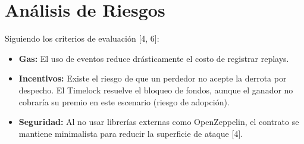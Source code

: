 \documentclass[twocolumn, 10pt]{article}
\begin{document}
\section{Análisis de Riesgos}
Siguiendo los criterios de evaluación [4, 6]:
\begin{itemize}
    \item \textbf{Gas:} El uso de eventos reduce drásticamente el costo de registrar replays.
    \item \textbf{Incentivos:} Existe el riesgo de que un perdedor no acepte la derrota por despecho. El Timelock resuelve el bloqueo de fondos, aunque el ganador no cobraría su premio en este escenario (riesgo de adopción).
    \item \textbf{Seguridad:} Al no usar librerías externas como OpenZeppelin, el contrato se mantiene minimalista para reducir la superficie de ataque [4].
\end{itemize}
\end{document}
